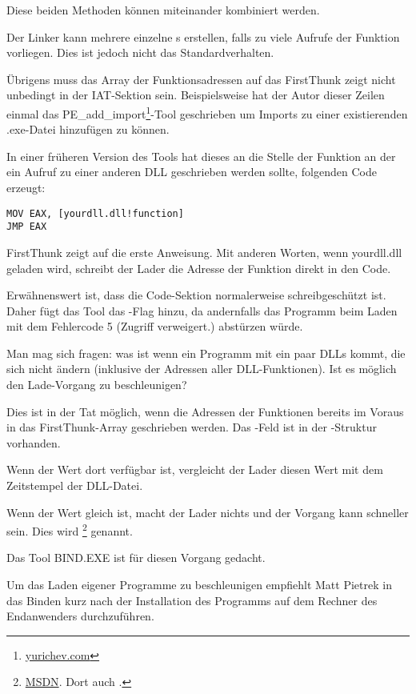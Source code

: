 Diese beiden Methoden können miteinander kombiniert werden.

Der Linker kann mehrere einzelne s erstellen, falls zu viele Aufrufe der
Funktion vorliegen. Dies ist jedoch nicht das Standardverhalten.

Übrigens muss das Array der Funktionsadressen auf das FirstThunk zeigt nicht unbedingt
in der \ac{IAT}-Sektion sein. Beispielsweise hat der Autor dieser Zeilen einmal das
PE\_add\_import\footnote{\href{http://go.yurichev.com/17049}{yurichev.com}}-Tool
geschrieben um Imports zu einer existierenden .exe-Datei hinzufügen zu können.

In einer früheren Version des Tools hat dieses an die Stelle der Funktion an der
ein Aufruf zu einer anderen DLL geschrieben werden sollte, folgenden Code erzeugt:

\begin{lstlisting}
MOV EAX, [yourdll.dll!function]
JMP EAX
\end{lstlisting}

FirstThunk zeigt auf die erste Anweisung. Mit anderen Worten, wenn yourdll.dll
geladen wird, schreibt der Lader die Adresse der Funktion  direkt
in den Code.

Erwähnenswert ist, dass die Code-Sektion normalerweise schreibgeschützt ist.
Daher fügt das Tool das -Flag hinzu, da andernfalls
das Programm beim Laden mit dem Fehlercode 5 (Zugriff verweigert.) abstürzen
würde.

Man mag sich fragen: was ist wenn ein Programm mit ein paar DLLs kommt, die
sich nicht ändern (inklusive der Adressen aller DLL-Funktionen). Ist es möglich
den Lade-Vorgang zu beschleunigen?

Dies ist in der Tat möglich, wenn die Adressen der Funktionen bereits im Voraus
in das FirstThunk-Array geschrieben werden. Das -Feld ist in der
-Struktur vorhanden.

Wenn der Wert dort verfügbar ist, vergleicht der Lader diesen Wert mit dem
Zeitstempel der DLL-Datei.

Wenn der Wert gleich ist, macht der Lader nichts und der Vorgang kann schneller
sein. Dies wird \footnote{\href{http://go.yurichev.com/17050}{MSDN}. Dort auch .}
genannt.

Das Tool BIND.EXE ist für diesen Vorgang gedacht.

Um das Laden eigener Programme zu beschleunigen empfiehlt Matt Pietrek in \PietrekPEURL
das Binden kurz nach der Installation des Programms auf dem Rechner des Endanwenders
durchzuführen.

